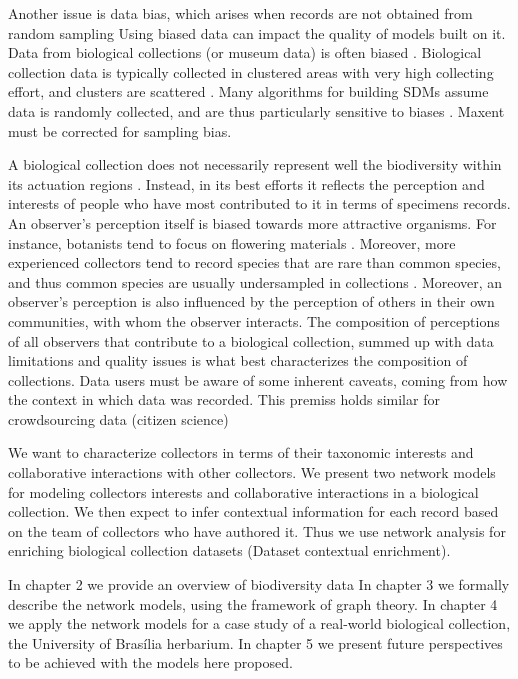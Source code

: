 Another issue is data bias, which arises when records are not obtained from random sampling \cite{Daru2017}
Using biased data can impact the quality of models built on it.
Data from biological collections (or museum data) is often biased \cite{Daru2017}.
Biological collection data is typically collected in clustered areas with very high collecting effort, and clusters are scattered \cite{VanGemerden2005}.
Many algorithms for building SDMs assume data is randomly collected, and are thus particularly sensitive to biases \cite{Araujo2016} .
Maxent must be corrected for sampling bias.%


A biological collection does not necessarily represent well the biodiversity within its actuation regions \cite{Funk1999}.
Instead, in its best efforts it reflects the perception and interests of people who have most contributed to it in terms of specimens records.
An observer's perception itself is biased towards more attractive organisms. 
For instance, botanists tend to focus on flowering materials \cite{VanGemerden2005}.
Moreover, more experienced collectors tend to record species that are rare than common species, and thus common species are usually undersampled in collections \cite{Nelson1990}.
Moreover, an observer's perception is also influenced by the perception of others in their own communities, with whom the observer interacts. 
The composition of perceptions of all observers that contribute to a biological collection, summed up with data limitations and quality issues is what best characterizes the composition of collections.
Data users must be aware of some inherent caveats, coming from how the context in which data was recorded. 
This premiss holds similar for crowdsourcing data (citizen science)


We want to characterize collectors in terms of their taxonomic interests and collaborative interactions with other collectors.
We present two network models for modeling collectors interests and collaborative interactions in a biological collection.
We then expect to infer contextual information for each record based on the team of collectors who have authored it.
Thus we use network analysis for enriching biological collection datasets (Dataset contextual enrichment).


In chapter 2 we provide an overview of biodiversity data
In chapter 3 we formally describe the network models, using the framework of graph theory.
In chapter 4 we apply the network models for a case study of a real-world biological collection, the University of Brasília herbarium.
In chapter 5 we present future perspectives to be achieved with the models here proposed.




